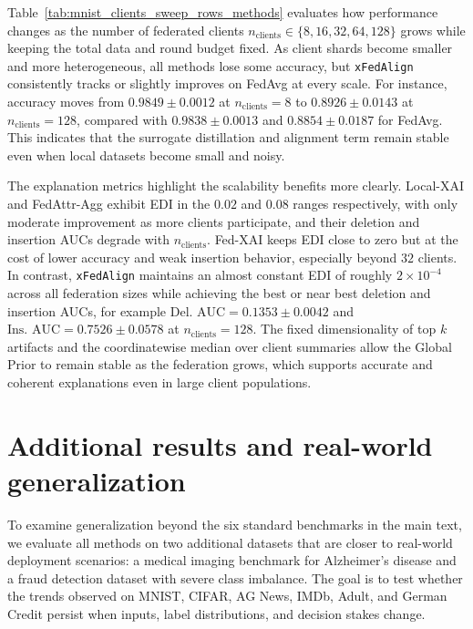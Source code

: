 \documentclass{article}
\theoremstyle{plain}
\theoremstyle{definition}
\theoremstyle{remark}
\begin{document}
Table~\ref{tab:mnist_clients_sweep_rows_methods} evaluates how performance changes as the number of federated clients
$n_{\text{clients}}\in\{8,16,32,64,128\}$ grows while keeping the total data and round budget fixed. As client shards
become smaller and more heterogeneous, all methods lose some accuracy, but \texttt{xFedAlign} consistently tracks or slightly
improves on FedAvg at every scale. For instance, accuracy moves from $0.9849\pm0.0012$ at $n_{\text{clients}}{=}8$ to
$0.8926\pm0.0143$ at $n_{\text{clients}}{=}128$, compared with $0.9838\pm0.0013$ and $0.8854\pm0.0187$ for FedAvg.
This indicates that the surrogate distillation and alignment term remain stable even when local datasets become small
and noisy.

The explanation metrics highlight the scalability benefits more clearly. Local-XAI and
FedAttr-Agg exhibit EDI in the $0.02$ and $0.08$ ranges respectively, with only moderate improvement as more
clients participate, and their deletion and insertion AUCs degrade with $n_{\text{clients}}$. Fed-XAI keeps
EDI close to zero but at the cost of lower accuracy and weak insertion behavior, especially beyond $32$ clients. In
contrast, \texttt{xFedAlign} maintains an almost constant EDI of roughly $2\times10^{-4}$ across all federation sizes while
achieving the best or near best deletion and insertion AUCs, for example $\text{Del.\ AUC}=0.1353\pm0.0042$ and
$\text{Ins.\ AUC}=0.7526\pm0.0578$ at $n_{\text{clients}}{=}128$. The fixed dimensionality of top $k$ artifacts and the
coordinatewise median over client summaries allow the Global Prior to remain stable as the federation grows, which
supports accurate and coherent explanations even in large client populations.





\section{Additional results and real-world generalization}
\label{app:additional-results}

To examine generalization beyond the six standard benchmarks in the main text, we evaluate all methods on two additional datasets that are closer to real-world deployment scenarios: a medical imaging benchmark for Alzheimer’s disease and a fraud detection dataset with severe class imbalance. The goal is to test whether the trends observed on MNIST, CIFAR, AG News, IMDb, Adult, and German Credit persist when inputs, label distributions, and decision stakes change.
\end{document}

